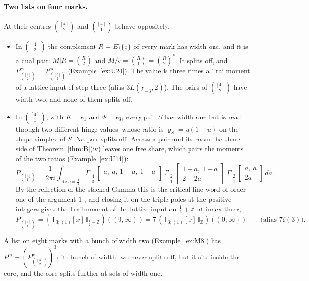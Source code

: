 \documentclass[11pt]{article}
\theoremstyle{plain}
\theoremstyle{definition}
\theoremstyle{remark}
\newcommand{\Z}{\mathbb Z}
\newcommand{\m}{\mathfrak m}
\newcommand{\sT}{\mathsf T}
\newcommand{\Gst}[4]{\Gamma_{\substack{#1\\#2}}\!\begin{bmatrix}#3\\#4\end{bmatrix}}
\newcommand{\IZ}{\mathbb I_{\mathbb Z}}
\newcommand{\Ilat}[1]{\mathbb I_{#1}}
\newcommand{\Tx}[3]{(\sT_{#1;(1)}[x]\,#2)((#3,\infty))}
\DeclareMathOperator{\re}{Re}
\begin{document}
\paragraph{Two lists on four marks.} At their centres $\binom{[4]}2$ and $\binom{[4]}1$ behave oppositely.
\begin{itemize}
\item In $\binom{[4]}2$ the complement $R=E\setminus\{e\}$ of every mark has width one, and it is a dual pair: $M|R=\binom R2$ and $M/e=\binom R1=\binom R2^\ast$. It splits off, and $P^{\m}_{\binom{[4]}2}=P^{\m}_{\binom{[3]}2}$ (Example~\ref{ex:U24}). The value is three times a Trailmoment of a lattice input of step three (alias $3L(\chi_{-3},2)$). The pairs of $\binom{[4]}2$ have width two, and none of them splits off.
\item In $\binom{[4]}1$, with $K=e_1$ and $\Psi=e_3$, every pair $S$ has width one but is read through two different hinge values, whose ratio is $\varrho_S=u(1-u)$ on the shape simplex of $S$. No pair splits off. Across a pair and its room the share side of Theorem~\ref{thm:B}(iv) leaves one free share, which pairs the moments of the two ratios (Example~\ref{ex:U14}):
\[
P_{\binom{[4]}1}=\frac1{2\pi i}\int_{\re a=\frac12}\Gst40{a,\ a,\ 1-a,\ 1-a}{}\ \Gst21{1-a,\ 1-a}{2-2a}\ \Gst21{a,\ a}{2a}\,da .
\]
By the reflection of the stacked Gamma this is the critical-line word of order one of the argument $1$ \cite[Def.~33.3, p.~298]{F}, and closing it on the triple poles at the positive integers gives the Trailmoment of the lattice input on $\frac12+\Z$ at index three,
\[
P_{\binom{[4]}1}=\Tx{3}{\Ilat{\frac12+\Z}}{0}=7\,\Tx{3}{\IZ}{0}\qquad\text{(alias $7\zeta(3)$)}.
\]
\end{itemize}
A list on eight marks with a bunch of width two (Example~\ref{ex:M8}) has $P^{\m}=(P^{\m}_{\binom{[3]}2})^3$: its bunch of width two never splits off, but it sits inside the core, and the core splits further at sets of width one.
\end{document}

